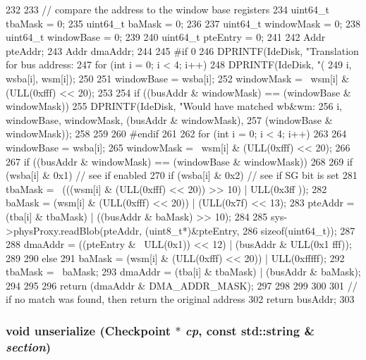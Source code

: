 \begin{DoxyCode}
232 {
233     // compare the address to the window base registers
234     uint64_t tbaMask = 0;
235     uint64_t baMask = 0;
236 
237     uint64_t windowMask = 0;
238     uint64_t windowBase = 0;
239 
240     uint64_t pteEntry = 0;
241 
242     Addr pteAddr;
243     Addr dmaAddr;
244 
245 #if 0
246     DPRINTF(IdeDisk, "Translation for bus address: %
247     for (int i = 0; i < 4; i++) {
248         DPRINTF(IdeDisk, "(%
249                 i, wsba[i], wsm[i]);
250 
251         windowBase = wsba[i];
252         windowMask = ~wsm[i] & (ULL(0xfff) << 20);
253 
254         if ((busAddr & windowMask) == (windowBase & windowMask)) {
255             DPRINTF(IdeDisk, "Would have matched %
      wb&wm:%
256                     i, windowBase, windowMask, (busAddr & windowMask),
257                     (windowBase & windowMask));
258         }
259     }
260 #endif
261 
262     for (int i = 0; i < 4; i++) {
263 
264         windowBase = wsba[i];
265         windowMask = ~wsm[i] & (ULL(0xfff) << 20);
266 
267         if ((busAddr & windowMask) == (windowBase & windowMask)) {
268 
269             if (wsba[i] & 0x1) {   // see if enabled
270                 if (wsba[i] & 0x2) { // see if SG bit is set
281                     tbaMask = ~(((wsm[i] & (ULL(0xfff) << 20)) >> 10) | ULL(0x3ff
      ));
282                     baMask = (wsm[i] & (ULL(0xfff) << 20)) | (ULL(0x7f) << 13);
283                     pteAddr = (tba[i] & tbaMask) | ((busAddr & baMask) >> 10);
284 
285                     sys->physProxy.readBlob(pteAddr, (uint8_t*)&pteEntry,
286                                             sizeof(uint64_t));
287 
288                     dmaAddr = ((pteEntry & ~ULL(0x1)) << 12) | (busAddr & ULL(0x1
      fff));
289 
290                 } else {
291                     baMask = (wsm[i] & (ULL(0xfff) << 20)) | ULL(0xfffff);
292                     tbaMask = ~baMask;
293                     dmaAddr = (tba[i] & tbaMask) | (busAddr & baMask);
294                 }
295 
296                 return (dmaAddr & DMA_ADDR_MASK);
297             }
298         }
299     }
300 
301     // if no match was found, then return the original address
302     return busAddr;
303 }
\end{DoxyCode}
\hypertarget{classTsunamiPChip_af22e5d6d660b97db37003ac61ac4ee49}{
\subsubsection[{unserialize}]{\setlength{\rightskip}{0pt plus 5cm}void unserialize ({\bf Checkpoint} $\ast$ {\em cp}, \/  const std::string \& {\em section})}}
